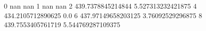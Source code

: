 0 nan nan
1 nan nan
2 439.7378845214844 5.527313232421875
4 434.2105712890625 0.0
6 437.97149658203125 3.76092529296875
8 439.7553405761719 5.544769287109375
